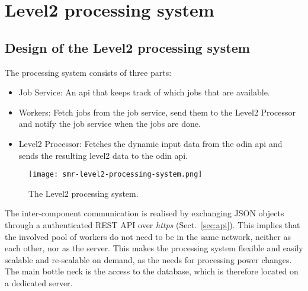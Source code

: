 \chapter{Level2 processing system}

\section{Design of the Level2 processing system}

The processing system consists of three parts:

\begin{itemize}
\item Job Service: An api that keeps track of which jobs that are available.
\item Workers: Fetch jobs from the job service, send them to the Level2
  Processor and notify the job service when the jobs are done.
\item Level2 Processor: Fetches the dynamic input data from the odin api
  and sends the resulting level2 data to the odin api.
\end{itemize}

\begin{figure}[h]
  \centering
  \texttt{[image: smr-level2-processing-system.png]}
  \caption{The Level2 processing system.}
  \label{fig:processing}
\end{figure}

The inter-component communication is realised by exchanging JSON objects
through a authenticated REST API over \emph{https} (Sect.~\ref{sec:api}). This
implies that the involved pool of workers do not need to be in the same
network, neither as each other, nor as the server. This makes the processing
system flexible and easily scalable and re-scalable on demand, as the needs for
processing power changes. The main bottle neck is the access to the database,
which is therefore located on a dedicated server.
